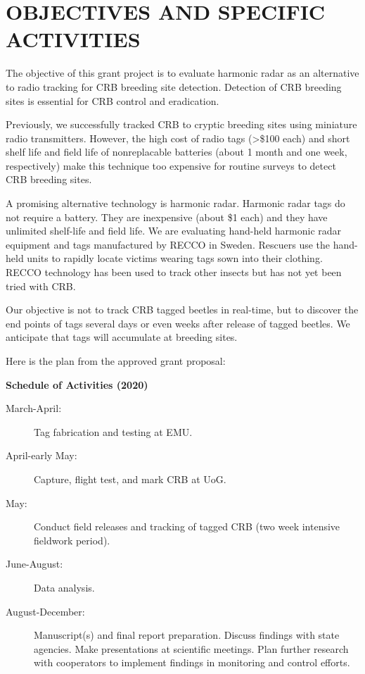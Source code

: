 \documentclass[12pt,letterpaper,english,bibliography=totocnumbered,abstract=on]{scrartcl}
\begin{document}
\clearpage


\section{OBJECTIVES AND SPECIFIC ACTIVITIES} 


The objective of this grant project is to evaluate harmonic radar as an alternative to radio tracking for CRB breeding site detection. Detection of CRB breeding sites is essential for CRB control and eradication.

Previously, we successfully tracked CRB to cryptic breeding sites using miniature radio transmitters. However, the high cost of radio tags (>\$100 each) and short shelf life and field life of nonreplacable batteries (about 1 month and one week, respectively) make this technique too expensive for routine surveys to detect CRB breeding sites. 

A promising alternative technology is harmonic radar. Harmonic radar tags do not require a battery. They are inexpensive (about \$1 each) and they have unlimited shelf-life and field life. We are evaluating hand-held harmonic radar equipment and tags manufactured by RECCO in Sweden. Rescuers use the hand-held units to rapidly locate victims wearing tags sown into their clothing. RECCO technology has been used to track other insects but has not yet been tried with CRB.

Our objective is not to track CRB tagged beetles in real-time, but to discover the end points of tags several days or even weeks after release of tagged beetles. We anticipate that tags will accumulate at breeding sites.

Here is the plan from the approved grant proposal:

\medskip
\colorbox[gray]{0.9}{\parbox{\textwidth}{
	\textbf{Schedule of Activities (2020)}
	\begin{description}
		\item[March-April:] Tag fabrication and testing at EMU.
		\item[April-early May:] Capture, flight test, and mark CRB at UoG.
		\item[May:] Conduct field releases and tracking of tagged CRB (two week intensive fieldwork period).
		\item[June-August:] Data analysis.
		\item[August-December:] Manuscript(s) and final report preparation.  Discuss findings with state agencies.  Make presentations at scientific meetings.  Plan further research with cooperators to implement findings in monitoring and control efforts.
	\end{description}
}}
\medskip
\end{document}
